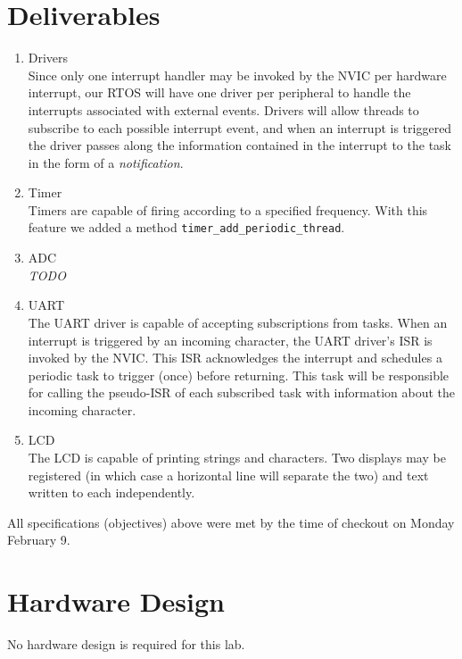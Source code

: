 \documentclass[12pt]{article}
\newcommand{\todo}{{\LARGE \emph{\color{red}TODO}}}
\begin{document}
\section{Deliverables}
\begin{enumerate}
\item Drivers \\
  Since only one interrupt handler may be invoked by the NVIC per
  hardware interrupt, our RTOS will have one driver per peripheral to
  handle the interrupts associated with external events. Drivers will
  allow threads to subscribe to each possible interrupt event, and
  when an interrupt is triggered the driver passes along the
  information contained in the interrupt to the task in the form of a
  \emph{notification}.
\item Timer \\
  Timers are capable of firing according to a specified
  frequency. With this feature we added a method
  \verb|timer_add_periodic_thread|.
\item ADC \\

  \todo
\item UART \\
  The UART driver is capable of accepting subscriptions from
  tasks. When an interrupt is triggered by an incoming character, the
  UART driver's ISR is invoked by the NVIC. This ISR acknowledges the
  interrupt and schedules a periodic task to trigger (once) before
  returning. This task will be responsible for calling the pseudo-ISR
  of each subscribed task with information about the incoming
  character.
\item LCD \\
  The LCD is capable of printing strings and characters. Two displays
  may be registered (in which case a horizontal line will separate the
  two) and text written to each independently.
\end{enumerate}
All specifications (objectives) above were met by the time of checkout
on Monday February 9.
\section{Hardware Design}
No hardware design is required for this lab.
\end{document}

